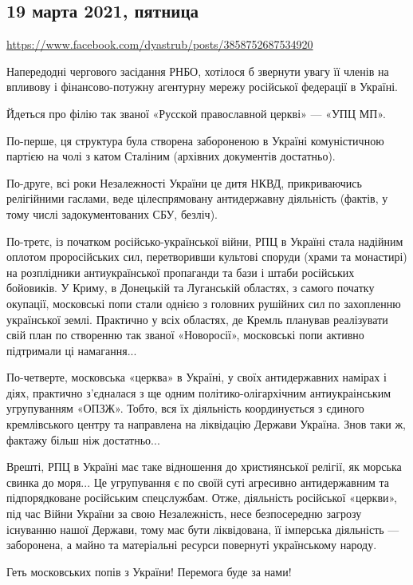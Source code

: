  
 
 
 
 
\subsection{19 марта 2021, пятница}
\label{sec:19_03_2021}
\url{https://www.facebook.com/dyastrub/posts/3858752687534920}

Напередодні чергового засідання РНБО, хотілося б звернути увагу її членів на
впливову  і фінансово-потужну агентурну мережу російської федерації в Україні.

Йдеться про філію так званої «Русской православной церкві» — «УПЦ МП».

По-перше, ця структура була створена забороненою в Україні комуністичною
партією на чолі з катом Сталіним (архівних документів достатньо).

По-друге, всі роки Незалежності України це дитя НКВД, прикриваючись релігійними
гаслами, веде цілеспрямовану антидержавну діяльність (фактів, у тому числі
задокументованих СБУ, безліч).

По-третє, із початком російсько-української війни, РПЦ в Україні стала надійним
оплотом проросійських сил, перетворивши культові споруди (храми та монастирі)
на розплідники антиукраїнської пропаганди та бази і штаби російських бойовиків.
У Криму, в Донецькій та Луганській областях, з самого початку окупації,
московські попи стали однією з головних рушійних сил по захопленню української
землі. Практично у всіх областях, де Кремль планував реалізувати свій план по
створенню так званої «Новоросії», московські попи активно підтримали ці
намагання...

По-четверте, московська «церква» в Україні, у своїх антидержавних намірах і
діях, практично з’єдналася з ще одним політико-олігархічним антиукраінським
угрупуванням «ОПЗЖ». Тобто, вся їх діяльність координується з єдиного
кремлівського центру та направлена на ліквідацію Держави Україна. Знов таки ж,
фактажу більш ніж достатньо...

Врешті, РПЦ в Україні має таке відношення до християнської релігії, як морська
свинка до моря... Це угрупування є по своїй суті агресивно антидержавним та
підпорядковане російським спецслужбам. Отже, діяльність російської «церкви»,
під час Війни України за свою Незалежність, несе безпосередню загрозу існуванню
нашої Держави, тому має бути ліквідована, її імперська діяльність — заборонена,
а майно та матеріальні ресурси повернуті українському народу.

Геть московських попів з України! Перемога буде за нами!
